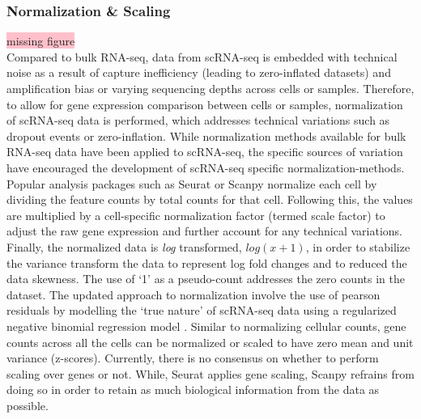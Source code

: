 \subsubsection{Normalization \& Scaling}
\colorbox{pink}{missing figure}\\
Compared to bulk RNA-seq, data from scRNA-seq is embedded with technical noise as a result of capture inefficiency (leading to zero-inflated datasets) and amplification bias or varying sequencing depths across cells or samples. Therefore, to allow for gene expression comparison between cells or samples, normalization of scRNA-seq data is performed, which addresses technical variations such as dropout events or zero-inflation. While normalization methods available for bulk RNA-seq data have been applied to scRNA-seq, the specific sources of variation have encouraged the development of scRNA-seq specific normalization-methods. Popular analysis packages such as Seurat \textbf{\cite{butler_integrating_2018,stuart_comprehensive_2019,hao_integrated_2021}} or Scanpy \textbf{\cite{wolf_scanpy_2018}} normalize each cell by dividing the feature counts by total counts for that cell. Following this, the values are multiplied by a cell-specific normalization factor (termed scale factor) to adjust the raw gene expression and further account for any technical variations. Finally, the normalized data is \textit{log} transformed, \begin{math}log(x+1)\end{math}, in order to stabilize the variance transform the data to represent log fold changes and to reduced the data skewness. The use of ‘1’ as a pseudo-count addresses the zero counts in the dataset. The updated approach to normalization involve the use of pearson residuals by modelling the ‘true nature’ of scRNA-seq data using a regularized negative binomial regression model \textbf{\cite{hafemeister_normalization_2019}}.  Similar to normalizing cellular counts, gene counts across all the cells can be normalized or scaled to have zero mean and unit variance (z-scores). Currently, there is no consensus on whether to perform scaling over genes or not. While, Seurat \textbf{\cite{stuart_comprehensive_2019,hao_integrated_2021}} applies gene scaling, Scanpy \textbf{\cite{wolf_scanpy_2018}} refrains from doing so in order to retain as much biological information from the data as possible.

